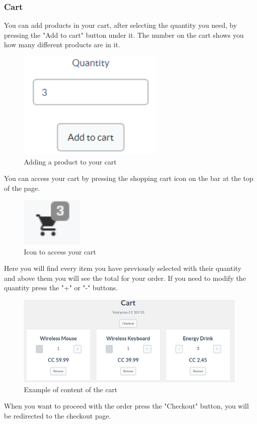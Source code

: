 	\subsubsection{Cart}
	You can add products in your cart, after selecting the quantity you need, 
	by pressing the "Add to cart" button under it. The number on the cart shows
	you how many different products are in it.\\
	\begin{figure}[H]
		\includegraphics[width=7cm]{res/images/add_to_cart.png}
		\centering
		\caption{Adding a product to your cart}
	\end{figure}
	\noindent You can access your cart by pressing the shopping cart icon on 
	the bar at the top of the page.
	\begin{figure}[H]
		\includegraphics[width=3cm]{res/images/cart_icon.png}
		\centering
		\caption{Icon to access your cart}
	\end{figure}
	\noindent Here you will find every item you have previously selected with 
	their quantity and above them you will see the total for your order.
	If you need to modify the quantity press the "+" or "-" buttons. \\
	\begin{figure}[H]
		\includegraphics[width=15cm]{res/images/cart_example.png}
		\centering
		\caption{Example of content of the cart}
	\end{figure}
	\noindent When you want to proceed with the order press the "Checkout" button, 
	you will be redirected to the checkout page.
